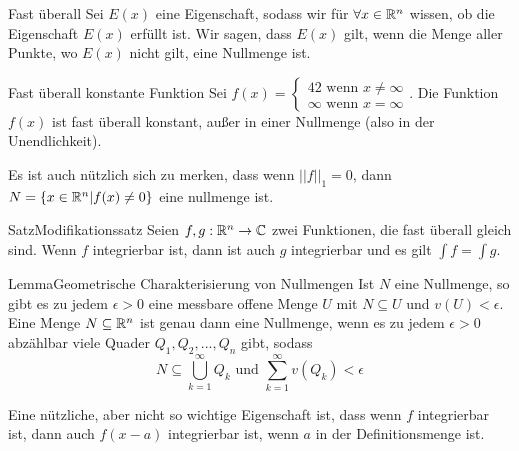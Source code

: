 \begin{Def}{Fast überall}
Sei $E(x)$ eine Eigenschaft, sodass wir für $\forall x \in \mathbb{R}^n$ wissen, ob die Eigenschaft $E(x)$ erfüllt ist. Wir sagen, dass $E(x)$  gilt, wenn die Menge aller Punkte, wo $E(x)$ nicht gilt, eine Nullmenge ist.
\end{Def}
\begin{Beispiel}{Fast überall konstante Funktion}
Sei $f(x)=\begin{cases}42 \mbox{ wenn $x\neq \infty$} \\
\infty \mbox{ wenn $x=\infty$}\end{cases}$. Die Funktion $f(x)$ ist fast überall konstant, außer in einer Nullmenge (also in der Unendlichkeit). 
\end{Beispiel}
Es ist auch nützlich sich zu merken, dass wenn $||f||_1=0$, dann $N=\{ x\in \mathbb{R}^n | f(x)\neq 0\}$ eine nullmenge ist.
\begin{Satz}{Satz}{Modifikationssatz}
Seien $f,g:\mathbb{R}^n\rightarrow \mathbb{C}$ zwei Funktionen, die fast überall gleich sind. Wenn $f$ integrierbar ist, dann ist auch $g$ integrierbar und es gilt $\int f = \int g$.
\end{Satz}
\begin{Satz}{Lemma}{Geometrische Charakterisierung von Nullmengen}
    Ist $N$ eine Nullmenge, so gibt es zu jedem $\epsilon>0$ eine messbare offene Menge $U$ mit $N\subseteq U$ und $v(U)<\epsilon$. \\
    Eine Menge $N\subseteq \mathbb{R}^n$ ist genau dann eine Nullmenge, wenn es zu jedem $\epsilon>0$ abzählbar viele Quader $Q_1, Q_2, ..., Q_n$ gibt, sodass
    $$N\subseteq \bigcup_{k=1}^{\infty}Q_k \mbox{ und }\sum_{k=1}^\infty v(Q_k)<\epsilon$$
\end{Satz}
Eine nützliche, aber nicht so wichtige Eigenschaft ist, dass wenn $f$ integrierbar ist, dann auch $f(x-a)$ integrierbar ist, wenn $a$ in der Definitionsmenge ist.
\newpage
